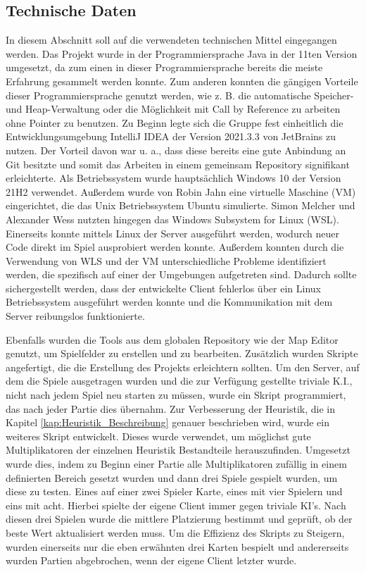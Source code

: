 \documentclass[12pt,a4paper,bibliography=totocnumbered,listof=totocnumbered]{article}
\begin{document}
\newpage

\subsection{Technische Daten}
In diesem Abschnitt soll auf die verwendeten technischen Mittel eingegangen werden. Das Projekt wurde in der Programmiersprache Java in der 11ten Version umgesetzt, da zum einen in dieser Programmiersprache bereits die meiste Erfahrung gesammelt werden konnte. Zum anderen konnten die gängigen Vorteile dieser Programmiersprache genutzt werden, wie z. B. die automatische Speicher- und Heap-Verwaltung oder die Möglichkeit mit \glqq Call by Reference\grqq{} zu arbeiten ohne Pointer zu benutzen.
Zu Beginn legte sich die Gruppe fest einheitlich die Entwicklungsumgebung IntelliJ IDEA der Version 2021.3.3 von JetBrains zu nutzen. Der Vorteil davon war u. a., dass diese bereits eine gute Anbindung an Git besitzte und somit das Arbeiten in einem gemeinsam Repository signifikant erleichterte.
Als Betriebssystem wurde hauptsächlich Windows 10 der Version 21H2 verwendet. Außerdem wurde von Robin Jahn eine virtuelle Maschine (VM) eingerichtet, die das Unix Betriebssystem Ubuntu simulierte. Simon Melcher und Alexander Wess nutzten hingegen das Windows Subsystem for Linux (WSL). Einerseits konnte mittels Linux der Server ausgeführt werden, wodurch neuer Code direkt im Spiel ausprobiert werden konnte. Außerdem konnten durch die Verwendung von WLS und der VM unterschiedliche Probleme identifiziert werden, die spezifisch auf einer der Umgebungen aufgetreten sind. Dadurch sollte sichergestellt werden, dass der entwickelte Client fehlerlos über ein Linux Betriebssystem ausgeführt werden konnte und die Kommunikation mit dem Server reibungslos funktionierte.

Ebenfalls wurden die Tools aus dem globalen Repository wie der Map Editor genutzt, um Spielfelder zu erstellen und zu bearbeiten. Zusätzlich wurden Skripte angefertigt, die die Erstellung des Projekts erleichtern sollten. Um den Server, auf dem die Spiele ausgetragen wurden und die zur Verfügung gestellte triviale K.I., nicht nach jedem Spiel neu starten zu müssen, wurde ein Skript programmiert, das nach jeder Partie dies übernahm. Zur Verbesserung der Heuristik, die in Kapitel \ref{kap:Heuristik_Beschreibung} genauer beschrieben wird, wurde ein weiteres Skript entwickelt. Dieses wurde verwendet, um möglichst gute Multiplikatoren der einzelnen Heuristik Bestandteile herauszufinden. Umgesetzt wurde dies, indem zu Beginn einer Partie alle Multiplikatoren zufällig in einem definierten Bereich gesetzt wurden und dann drei Spiele gespielt wurden, um diese zu testen. Eines auf einer zwei Spieler Karte, eines mit vier Spielern und eins mit acht. Hierbei spielte der eigene Client immer gegen triviale KI's. Nach diesen drei Spielen wurde die mittlere Platzierung bestimmt und geprüft, ob der beste Wert aktualisiert werden muss. Um die Effizienz des Skripts zu Steigern, wurden einerseits nur die eben erwähnten drei Karten bespielt und andererseits wurden Partien abgebrochen, wenn der eigene Client letzter wurde.
\end{document}
